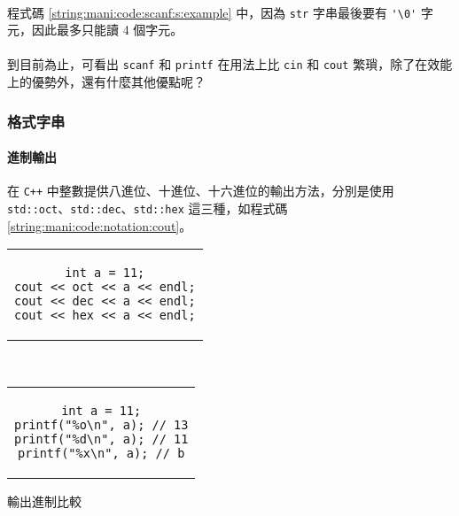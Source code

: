 \documentclass[12pt,a4paper,oneside]{article}
\begin{document}
\begin{CJK}{UTF8}{bkai}
\paragraph{}程式碼 \ref{string:mani:code:scanf:s:example} 中，因為 \lstinline!str! 字串最後要有 \lstinline!'\0'! 字元，因此最多只能讀 4 個字元。
\paragraph{}到目前為止，可看出 \lstinline!scanf! 和 \lstinline!printf! 在用法上比 \lstinline!cin! 和 \lstinline!cout! 繁瑣，除了在效能上的優勢外，還有什麼其他優點呢？

\subsubsection{格式字串}

\paragraph{進制輸出}在 \texttt{C++} 中整數提供八進位、十進位、十六進位的輸出方法，分別是使用 \lstinline!std::oct!、\lstinline!std::dec!、\lstinline!std::hex! 這三種，如程式碼 \ref{string:mani:code:notation:cout}。

\begin{code}[h!]
  \centering
  \begin{subcode}{.43\textwidth}
    \centering
    \begin{tabular}{c}
    \begin{lstlisting}
int a = 11;
cout << oct << a << endl;
cout << dec << a << endl;
cout << hex << a << endl;
    \end{lstlisting}
    \end{tabular}
    \caption{\lstinline!cout! 版本}
    \label{string:mani:code:notation:cout}
  \end{subcode}
  ~
  \begin{subcode}{.43\textwidth}
    \centering
    \begin{tabular}{c}
    \begin{lstlisting}
int a = 11;
printf("%o\n", a); // 13
printf("%d\n", a); // 11
printf("%x\n", a); // b
    \end{lstlisting}
    \end{tabular}
    \caption{\lstinline!printf! 版本}
    \label{string:mani:code:notation:printf}
  \end{subcode}
  \caption{輸出進制比較}
  \label{string:mani:code:notation}
\end{code}


\end{CJK}
\end{document}
